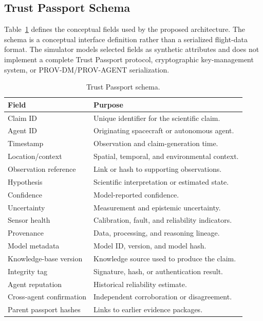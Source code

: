 \documentclass[10pt,conference]{IEEEtran}
\begin{document}
\subsection{Trust Passport Schema}

Table~\ref{tab:passport-schema} defines the conceptual fields used by the proposed architecture. The schema is a conceptual interface definition rather than a serialized flight-data format. The simulator models selected fields as synthetic attributes and does not implement a complete Trust Passport protocol, cryptographic key-management system, or PROV-DM/PROV-AGENT serialization.

\begin{table}[t]
\centering
\caption{Trust Passport schema.}
\label{tab:passport-schema}
\scriptsize
\begin{tabular}{p{2.5cm}p{11.5cm}}
\toprule
Field & Purpose \\
\midrule
Claim ID & Unique identifier for the scientific claim. \\
Agent ID & Originating spacecraft or autonomous agent. \\
Timestamp & Observation and claim-generation time. \\
Location/context & Spatial, temporal, and environmental context. \\
Observation reference & Link or hash to supporting observations. \\
Hypothesis & Scientific interpretation or estimated state. \\
Confidence & Model-reported confidence. \\
Uncertainty & Measurement and epistemic uncertainty. \\
Sensor health & Calibration, fault, and reliability indicators. \\
Provenance & Data, processing, and reasoning lineage. \\
Model metadata & Model ID, version, and model hash. \\
Knowledge-base version & Knowledge source used to produce the claim. \\
Integrity tag & Signature, hash, or authentication result. \\
Agent reputation & Historical reliability estimate. \\
Cross-agent confirmation & Independent corroboration or disagreement. \\
Parent passport hashes & Links to earlier evidence packages. \\
\bottomrule
\end{tabular}
\end{table}
\end{document}
